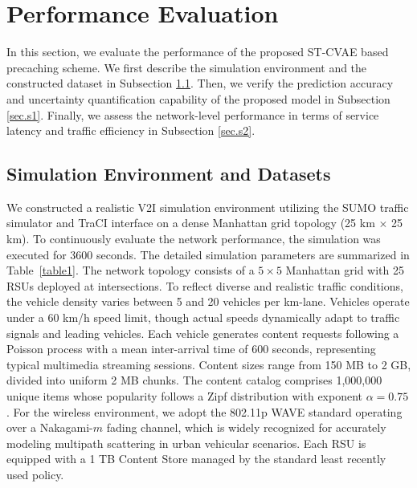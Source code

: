 \documentclass[journal]{IEEEtran}
\begin{document}
\section{Performance Evaluation} \label{sec.s}
In this section, we evaluate the performance of the proposed ST-CVAE based precaching scheme.
We first describe the simulation environment and the constructed dataset in Subsection \ref{sec.s0}.
Then, we verify the prediction accuracy and uncertainty quantification capability of the proposed model in Subsection \ref{sec.s1}.
Finally, we assess the network-level performance in terms of service latency and traffic efficiency in Subsection \ref{sec.s2}.

\subsection{Simulation Environment and Datasets} \label{sec.s0}
We constructed a realistic V2I simulation environment utilizing the SUMO traffic simulator and TraCI interface on a dense Manhattan grid topology (25 km $\times$ 25 km).
To continuously evaluate the network performance, the simulation was executed for 3600 seconds.
The detailed simulation parameters are summarized in Table~\ref{table1}.
The network topology consists of a $5 \times 5$ Manhattan grid with 25 RSUs deployed at intersections.
To reflect diverse and realistic traffic conditions, the vehicle density varies between 5 and 20 vehicles per km-lane.
Vehicles operate under a 60 km/h speed limit, though actual speeds dynamically adapt to traffic signals and leading vehicles.
Each vehicle generates content requests following a Poisson process with a mean inter-arrival time of 600 seconds, representing typical multimedia streaming sessions.
Content sizes range from 150 MB to 2 GB, divided into uniform 2 MB chunks.
The content catalog comprises 1,000,000 unique items whose popularity follows a Zipf distribution with exponent $\alpha=0.75$.
For the wireless environment, we adopt the 802.11p WAVE standard operating over a Nakagami-$m$ fading channel, which is widely recognized for accurately modeling multipath scattering in urban vehicular scenarios.
Each RSU is equipped with a 1 TB Content Store managed by the standard least recently used policy.
\end{document}
